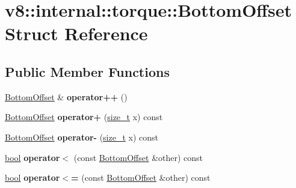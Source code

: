 \hypertarget{structv8_1_1internal_1_1torque_1_1BottomOffset}{}\section{v8\+:\+:internal\+:\+:torque\+:\+:Bottom\+Offset Struct Reference}
\label{structv8_1_1internal_1_1torque_1_1BottomOffset}
\subsection*{Public Member Functions}
\begin{DoxyCompactItemize}
\item 
\mbox{\label{structv8_1_1internal_1_1torque_1_1BottomOffset_af9c8494b5bacaba61b9bd17a3d9686da}} 
\mbox{\hyperlink{structv8_1_1internal_1_1torque_1_1BottomOffset}{Bottom\+Offset}} \& {\bfseries operator++} ()
\item 
\mbox{\label{structv8_1_1internal_1_1torque_1_1BottomOffset_a6be1e0f289bdc4062b7f7fd054689788}} 
\mbox{\hyperlink{structv8_1_1internal_1_1torque_1_1BottomOffset}{Bottom\+Offset}} {\bfseries operator+} (\mbox{\hyperlink{classsize__t}{size\+\_\+t}} x) const
\item 
\mbox{\label{structv8_1_1internal_1_1torque_1_1BottomOffset_a2ebb50494ff6d4ed2ca39b53aac19ec7}} 
\mbox{\hyperlink{structv8_1_1internal_1_1torque_1_1BottomOffset}{Bottom\+Offset}} {\bfseries operator-\/} (\mbox{\hyperlink{classsize__t}{size\+\_\+t}} x) const
\item 
\mbox{\label{structv8_1_1internal_1_1torque_1_1BottomOffset_a818d2f1fc3efb9dc973e7c4623ef077b}} 
\mbox{\hyperlink{classbool}{bool}} {\bfseries operator$<$} (const \mbox{\hyperlink{structv8_1_1internal_1_1torque_1_1BottomOffset}{Bottom\+Offset}} \&other) const
\item 
\mbox{\label{structv8_1_1internal_1_1torque_1_1BottomOffset_acc8fafd8a49a372add631180b445d16f}} 
\mbox{\hyperlink{classbool}{bool}} {\bfseries operator$<$=} (const \mbox{\hyperlink{structv8_1_1internal_1_1torque_1_1BottomOffset}{Bottom\+Offset}} \&other) const

\end{DoxyCompactItemize}
